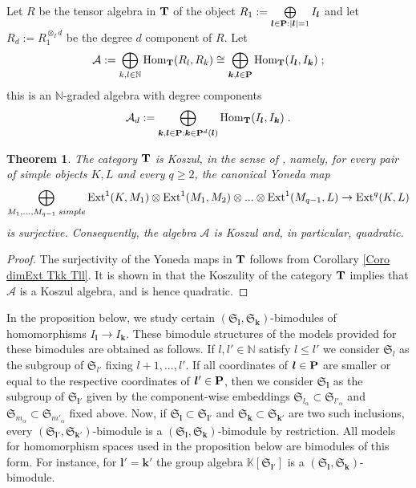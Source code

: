 \documentclass[12pt]{article}
\def\KK {{\mathbb K}}     %
\def\NN {{\mathbb N}}     %
\def\mc {\mathcal}
\def\mk {\mathfrak}
\newtheorem{theorem}{Theorem}[section]
\begin{document}
Let $R$ be the tensor algebra in ${\bf T}$ of the object $R_1:=\bigoplus\limits_{\bm l\in{\bf P}:|\bm l|=1} I_{\bm l}$ and let $R_d:=R_1^{\otimes_I d}$ be the degree $d$ component of $R$. Let
\begin{gather}\label{For Algebra A}
\mc A := \bigoplus\limits_{k,l\in\NN} {\rm Hom}_{{\bf T}}(R_l,R_k) \cong \bigoplus\limits_{\bm k,\bm l\in{\bf P}} {\rm Hom}_{{\bf T}}(I_{\bm l},I_{\bm k}) \;;
\end{gather}
this is an $\NN$-graded algebra with degree components
$$
\mc A_d:=\bigoplus\limits_{\bm k,\bm l\in{\bf P}:\bm k\in{\bf P}^d(\bm l)} {\rm Hom}_{{\bf T}}(I_{\bm l},I_{\bm k}) \;.
$$

\begin{theorem}\label{Theo IT Koszul A quadr}
The category ${\bf T}$ is Koszul, in the sense of \cite{Chirvasitu-Penkov-RC}, namely, for every pair of simple objects $K,L$ and every $q\geq 2$, the canonical Yoneda map
$$
\bigoplus\limits_{M_{1},...,M_{q-1}\; simple} {\rm Ext}^1(K,M_1)\otimes {\rm Ext}^1(M_1,M_2)\otimes...\otimes {\rm Ext}^1(M_{q-1},L) \to {\rm Ext}^q(K,L)
$$
is surjective. Consequently, the algebra $\mc A$ is Koszul and, in particular, quadratic.
\end{theorem}

\begin{proof}
The surjectivity of the Yoneda maps in ${\bf T}$ follows from Corollary \ref{Coro dimExt Tkk Tll}. It is shown in \cite{Chirvasitu-Penkov-UTC} that the Koszulity of the category ${\bf T}$ implies that $\mc A$ is a Koszul algebra, and is hence quadratic.  
\end{proof}


In the proposition below, we study certain $(\mk S_{\bm l},\mk S_{\bm k})$-bimodules of homomorphisms $I_{\bm l}\to I_{\bm k}$. These bimodule structures of the models provided for these bimodules are obtained as follows. If $l,l'\in\NN$ satisfy $l\leq l'$ we consider $\mk S_{l}$ as the subgroup of $\mk S_{l'}$ fixing $l+1,...,l'$. If all coordinates of $\bm l\in{\bf P}$ are smaller or equal to the respective coordinates of $\bm l'\in{\bf P}$, then we consider $\mk S_{\bm l}$ as the subgroup of $\mk S_{\bm l'}$ given by the component-wise embeddings $\mk S_{l_\alpha}\subset \mk S_{l'_{\alpha}}$ and $\mk S_{m_\alpha}\subset \mk S_{m'_{\alpha}}$ fixed above. Now, if $\mk S_{\bm l}\subset \mk S_{\bm l'}$ and $\mk S_{\bm k}\subset \mk S_{\bm k'}$ are two such inclusions, every $(\mk S_{\bm l'},\mk S_{\bm k'})$-bimodule is a $(\mk S_{\bm l},\mk S_{\bm k})$-bimodule by restriction. All models for homomorphism spaces used in the proposition below are bimodules of this form. For instance, for $\bm l'=\bm k'$ the group algebra $\KK[\mk S_{\bm l'}]$ is a $(\mk S_{\bm l},\mk S_{\bm k})$-bimodule.
\end{document}
